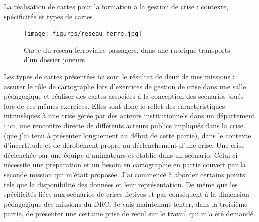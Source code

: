 \documentclass[10pt,a4paper]{report} %
\begin{document}
\begin{part}{La réalisation de cartes pour la formation à la gestion de crise : contexte, spécificités et types de cartes}
\begin{figure}[!t]
    \centering
    \texttt{[image: figures/reseau\_ferre.jpg]}
    \caption{Carte du réseau ferroviaire passagers, dans une rubrique transports d’un dossier joueurs}
    \label{fig12}
\end{figure}

Les types de cartes présentées ici sont le résultat de deux de mes missions : assurer le rôle de cartographe lors d’exercices de gestion de crise dans une salle pédagogique et réaliser des cartes associées à la conception des scénarios joués lors de ces mêmes exercices. Elles sont donc le reflet des caractéristiques intrinsèques à une crise gérée par des acteurs institutionnels dans un département : ici, une rencontre directe de différents acteurs publics impliqués dans la crise (que j’ai tenu à présenter longuement au début de cette partie), dans le contexte d’incertitude et de dérobement propre au déclenchement d’une crise. Une crise déclenchée par une équipe d’animateurs et établie dans un scénario. Celui-ci nécessite une préparation et un besoin en cartographie en partie couvert par la seconde mission qui m’était proposée. J’ai commencé à aborder certains points tels que la disponibilité des données et leur représentation. De même que les spécificités liées aux scénarios de crises fictives et par conséquent à la dimension pédagogique des missions du DRC. Je vais maintenant tenter, dans la troisième partie, de présenter une certaine prise de recul sur le travail qui m’a été demandé.


\end{part}



\end{document}
